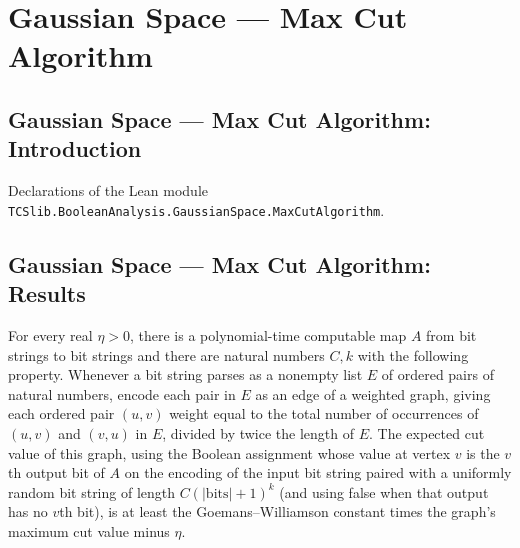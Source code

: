 \section{Gaussian Space --- Max Cut Algorithm}
\subsection*{Gaussian Space --- Max Cut Algorithm: Introduction}

Declarations of the Lean module \texttt{TCSlib.BooleanAnalysis.GaussianSpace.MaxCutAlgorithm}.

\subsection*{Gaussian Space --- Max Cut Algorithm: Results}

\begin{theorem}
\label{BooleanAnalysis.GaussianSpace.MaxCut.goemans_williamson_polyTime}
\leanok
{}
For every real $\eta>0$, there is a polynomial-time computable map $A$ from bit strings
to bit strings and there are natural numbers $C,k$ with the following property. Whenever
a bit string parses as a nonempty list $E$ of ordered pairs of natural numbers, encode
each pair in $E$ as an edge of a weighted graph, giving each ordered pair $(u,v)$ weight
equal to the total number of occurrences of $(u,v)$ and $(v,u)$ in $E$, divided by twice
the length of $E$. The expected cut value of this graph, using the Boolean assignment
whose value at vertex $v$ is the $v$th output bit of $A$ on the encoding of the input
bit string paired with a uniformly random bit string of length
$C(\lvert\text{bits}\rvert+1)^k$ (and using false when that output has no $v$th bit),
is at least the Goemans–Williamson constant times the graph’s maximum cut value minus
$\eta$.
\end{theorem}

